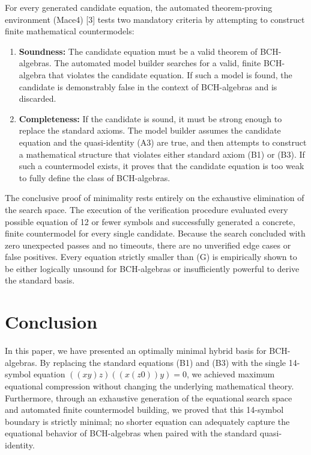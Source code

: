 \documentclass[11pt, a4paper]{article}
\begin{document}
For every generated candidate equation, the automated theorem-proving environment (Mace4) [3] tests two mandatory criteria by attempting to construct finite mathematical countermodels:
\begin{enumerate}
    \item \textbf{Soundness:} The candidate equation must be a valid theorem of BCH-algebras. The automated model builder searches for a valid, finite BCH-algebra that violates the candidate equation. If such a model is found, the candidate is demonstrably false in the context of BCH-algebras and is discarded.
    \item \textbf{Completeness:} If the candidate is sound, it must be strong enough to replace the standard axioms. The model builder assumes the candidate equation and the quasi-identity (A3) are true, and then attempts to construct a mathematical structure that violates either standard axiom (B1) or (B3). If such a countermodel exists, it proves that the candidate equation is too weak to fully define the class of BCH-algebras.
\end{enumerate}

The conclusive proof of minimality rests entirely on the exhaustive elimination of the search space. The execution of the verification procedure evaluated every possible equation of 12 or fewer symbols and successfully generated a concrete, finite countermodel for every single candidate. Because the search concluded with zero unexpected passes and no timeouts, there are no unverified edge cases or false positives. Every equation strictly smaller than (G) is empirically shown to be either logically unsound for BCH-algebras or insufficiently powerful to derive the standard basis.

\section{Conclusion}
In this paper, we have presented an optimally minimal hybrid basis for BCH-algebras. By replacing the standard equations (B1) and (B3) with the single 14-symbol equation $((xy)z)((x(z0))y) = 0$, we achieved maximum equational compression without changing the underlying mathematical theory. Furthermore, through an exhaustive generation of the equational search space and automated finite countermodel building, we proved that this 14-symbol boundary is strictly minimal; no shorter equation can adequately capture the equational behavior of BCH-algebras when paired with the standard quasi-identity.
\end{document}
